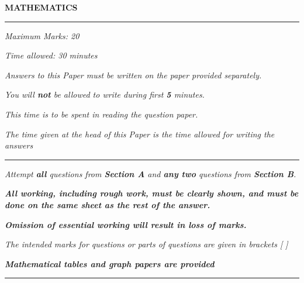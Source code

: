 \begin{center}
   \Large
   \textbf{MATHEMATICS}
   \rule{\textwidth}{0.4pt}
   \normalsize
   \textit{Maximum Marks: 20}

   \textit{Time allowed: 30 minutes}

   \textit{Answers to this Paper must be written on the paper provided separately.}

   \textit{You will \textbf{not} be allowed to write during first \textbf{5} minutes.}

   \textit{This time is to be spent in reading the question paper.}

   \textit{The time given at the head of this Paper is the time allowed for writing the answers}
   \rule{\textwidth}{0.4pt}
   \small

   \textit{Attempt \textbf{all} questions from \textbf{Section A} and \textbf{any two} questions from \textbf{Section B}.}

   \textit{\textbf{All working, including rough work, must be clearly shown, and must be done on the same sheet as the rest of the answer.}}

   \textit{\textbf{Omission of essential working will result in loss of marks.}}

   \textit{The intended marks for questions or parts of questions are given in brackets [ ]}

   \textit{\textbf{Mathematical tables and graph papers are provided}}
   \rule{\textwidth}{0.4pt}
\end{center}
